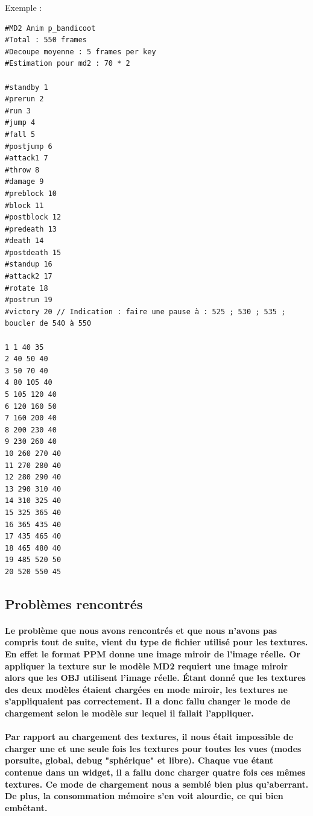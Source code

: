 Exemple :
\begin{scriptsize}\begin{verbatim}
#MD2 Anim p_bandicoot 
#Total : 550 frames 
#Decoupe moyenne : 5 frames per key 
#Estimation pour md2 : 70 * 2 

#standby 1 
#prerun 2 
#run 3 
#jump 4 
#fall 5 
#postjump 6 
#attack1 7 
#throw 8 
#damage 9 
#preblock 10 
#block 11 
#postblock 12 
#predeath 13 
#death 14 
#postdeath 15 
#standup 16 
#attack2 17 
#rotate 18 
#postrun 19 
#victory 20 // Indication : faire une pause à : 525 ; 530 ; 535 ; boucler de 540 à 550 

1 1 40 35
2 40 50 40
3 50 70 40
4 80 105 40
5 105 120 40
6 120 160 50
7 160 200 40
8 200 230 40
9 230 260 40
10 260 270 40
11 270 280 40
12 280 290 40
13 290 310 40
14 310 325 40
15 325 365 40
16 365 435 40
17 435 465 40
18 465 480 40
19 485 520 50
20 520 550 45
\end{verbatim}\end{scriptsize}





\vspace{1cm}
\subsection{Problèmes rencontrés}
\vspace{0.5cm}

\paragraph{Le problème que nous avons rencontrés et que nous n'avons pas compris tout de suite, vient du type de fichier utilisé pour les textures. En effet le format PPM donne une image miroir de l'image réelle. Or appliquer la texture sur le modèle MD2 requiert une image miroir alors que les OBJ utilisent l'image réelle. Étant donné que les textures des deux modèles étaient chargées en mode miroir, les textures ne s'appliquaient pas correctement. Il a donc fallu changer le mode de chargement selon le modèle sur lequel il fallait l'appliquer.}

\paragraph{Par rapport au chargement des textures, il nous était impossible de charger une et une seule fois les textures pour toutes les vues (modes porsuite, global, debug "sphérique" et libre). Chaque vue étant contenue dans un widget, il a fallu donc charger quatre fois ces m\^emes textures. Ce mode de chargement nous a semblé bien plus qu'aberrant. De plus, la consommation mémoire s'en voit alourdie, ce qui bien embêtant.}




